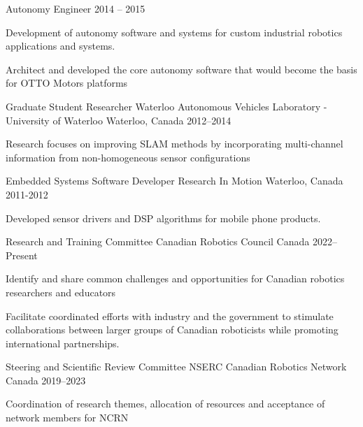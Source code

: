 \documentclass[11pt, a4paper]{awesome-cv}
\begin{document}
\begin{cventries}
\vspace*{-2mm}
\cventry
  {Autonomy Engineer} 
  {}
  {}
  {2014 -- 2015}
  {
  \begin{cvitems}
    \item Development of autonomy software and systems for custom industrial robotics applications and systems.
    \item Architect and developed the core autonomy software that would become the basis for OTTO Motors platforms
  \end{cvitems} 
  }

\cventry
  {Graduate Student Researcher} 
  {Waterloo Autonomous Vehicles Laboratory - University of Waterloo}
  {Waterloo, Canada}
  {2012--2014}
  {
    \begin{cvitems}
      \item Research focuses on improving SLAM methods by incorporating multi-channel information from non-homogeneous sensor configurations
    \end{cvitems}
  }

\cventry
  {Embedded Systems Software Developer} 
  {Research In Motion}
  {Waterloo, Canada}
  {2011-2012}
  {
  \begin{cvitems}
      \item Developed sensor drivers and DSP algorithms for mobile phone products. 
  \end{cvitems}
  }

\end{cventries}

\vspace{-4mm}
\begin{cventries}
\cventry
  {Research and Training Committee}
  {Canadian Robotics Council}
  {Canada}
  {2022--Present}
  {
    \begin{cvitems}
      \item Identify and share common challenges and opportunities for Canadian robotics researchers and educators
      \item Facilitate coordinated efforts with industry and the government to stimulate collaborations between larger groups of Canadian roboticists while promoting international partnerships.
    \end{cvitems}
  }

\vspace{-1mm}
\cventry
  {Steering and Scientific Review Committee}
  {NSERC Canadian Robotics Network}
  {Canada}
  {2019--2023}
  {
    \begin{cvitems}
      \item Coordination of research themes, allocation of resources and acceptance of network members for NCRN 
    \end{cvitems}
  }
\end{cventries}
\end{document}
